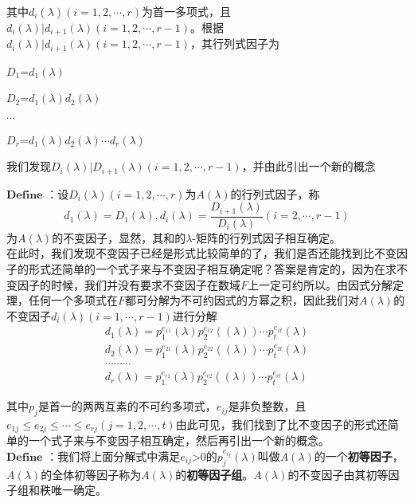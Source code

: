 \documentclass[lang=cn,10pt]{elegantbook}
\begin{document}
其中$d_{i}(\lambda )(i=1,2,\cdots,r)$为首一多项式，且$d_{i}(\lambda )|d_{i+1}(\lambda )(i=1,2,\cdots,r-1)$。根据$d_{i}(\lambda )|d_{i+1}(\lambda )(i=1,2,\cdots,r-1)$，其行列式因子为

$\mathit{D_{1}}$=$d_{1}(\lambda )$

$\mathit{D_{2}}$=$d_{1}(\lambda )d_{2}(\lambda )$

$\cdots$

$\mathit{D_{r}}$=$d_{1}(\lambda )d_{2}(\lambda )\cdots d_{r}(\lambda )$

我们发现$D_{i}(\lambda )|D_{i+1}(\lambda )(i=1,2,\cdots,r-1)$，并由此引出一个新的概念

$\mathbf{Define}$ ：设$D_{i}(\lambda )(i=1,2,\cdots,r)$为$\mathit{A}(\lambda)$的行列式因子，称
\begin{equation*}
	d_{1}(\lambda)=D_{1}(\lambda),  
		d_{i}(\lambda)=\frac{D_{i+1}(\lambda )}{D_{i}(\lambda )}(i=2,\cdots,r-1)
\end{equation*}
为$\mathit{A}(\lambda)$的不变因子，显然，其和的$\lambda$-矩阵的行列式因子相互确定。~\\


在此时，我们发现不变因子已经是形式比较简单的了，我们是否还能找到比不变因子的形式还简单的一个式子来与不变因子相互确定呢？答案是肯定的，因为在求不变因子的时候，我们并没有要求不变因子在数域$\mathit{F}$上一定可约所以。由因式分解定理，任何一个多项式在$\mathit{F}$都可分解为不可约因式的方幂之积，因此我们对$\mathit{A}(\lambda)$的不变因子$d_{i}(\lambda)(i=1,\cdots,r-1)$进行分解
\begin{equation*}
	\begin{split}
	d_{1}(\lambda)=p_{1}^{e_{11}}(\lambda)p_{2}^{e_{12}}((\lambda))\cdots p_{t}^{e_{1t}}(\lambda)\\
	d_{2}(\lambda)=p_{1}^{e_{21}}(\lambda)p_{2}^{e_{22}}((\lambda))\cdots p_{t}^{e_{2t}}(\lambda)\\
	\cdots \cdots \cdots\\
		d_{r}(\lambda)=p_{1}^{e_{r1}}(\lambda)p_{2}^{e_{r2}}((\lambda))\cdots p_{t}^{e_{rt}}(\lambda)
\end{split}
\end{equation*}

其中$\mathit{p}_{j}$是首一的两两互素的不可约多项式，$\mathit{e_{ij}}$是非负整数，且$\mathit{e_{1j}} \le \mathit{e_{2j}} \le \cdots \le \mathit{e_{rj}}(j=1,2,\cdots,t)$由此可见，我们找到了比不变因子的形式还简单的一个式子来与不变因子相互确定，然后再引出一个新的概念。~\\

$\mathbf{Define}$ ：我们将上面分解式中满足$\mathit{e_{ij}}$>0的$p_{j}^{e_{ij}}(\lambda)$叫做$\mathit{A}(\lambda)$的一个\textbf{初等因子}，$\mathit{A}(\lambda)$的全体初等因子称为$\mathit{A}(\lambda)$的\textbf{初等因子组}。$\mathit{A}(\lambda)$的不变因子由其初等因子组和秩唯一确定。
\end{document}
